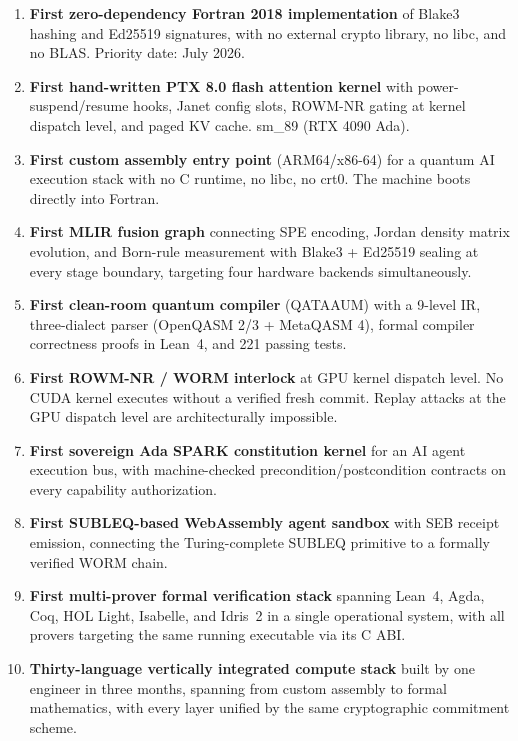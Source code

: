 \documentclass[11pt,a4paper]{article}
\begin{document}
\begin{enumerate}
\item \textbf{First zero-dependency Fortran 2018 implementation} of
  Blake3 hashing and Ed25519 signatures, with no external crypto
  library, no libc, and no BLAS. Priority date: July 2026.

\item \textbf{First hand-written PTX 8.0 flash attention kernel}
  with power-suspend/resume hooks, Janet config slots, ROWM-NR
  gating at kernel dispatch level, and paged KV cache. sm\_89
  (RTX 4090 Ada).

\item \textbf{First custom assembly entry point} (ARM64/x86-64)
  for a quantum AI execution stack with no C runtime, no libc,
  no crt0. The machine boots directly into Fortran.

\item \textbf{First MLIR fusion graph} connecting SPE encoding,
  Jordan density matrix evolution, and Born-rule measurement
  with Blake3 + Ed25519 sealing at every stage boundary, targeting
  four hardware backends simultaneously.

\item \textbf{First clean-room quantum compiler} (QATAAUM) with
  a 9-level IR, three-dialect parser (OpenQASM 2/3 + MetaQASM 4),
  formal compiler correctness proofs in Lean~4, and 221 passing tests.

\item \textbf{First ROWM-NR / WORM interlock} at GPU kernel dispatch
  level. No CUDA kernel executes without a verified fresh commit.
  Replay attacks at the GPU dispatch level are architecturally impossible.

\item \textbf{First sovereign Ada SPARK constitution kernel} for an
  AI agent execution bus, with machine-checked precondition/postcondition
  contracts on every capability authorization.

\item \textbf{First SUBLEQ-based WebAssembly agent sandbox} with
  SEB receipt emission, connecting the Turing-complete SUBLEQ primitive
  to a formally verified WORM chain.

\item \textbf{First multi-prover formal verification stack} spanning
  Lean~4, Agda, Coq, HOL Light, Isabelle, and Idris~2 in a single
  operational system, with all provers targeting the same running
  executable via its C ABI.

\item \textbf{Thirty-language vertically integrated compute stack}
  built by one engineer in three months, spanning from custom assembly
  to formal mathematics, with every layer unified by the same
  cryptographic commitment scheme.
\end{enumerate}
\end{document}
